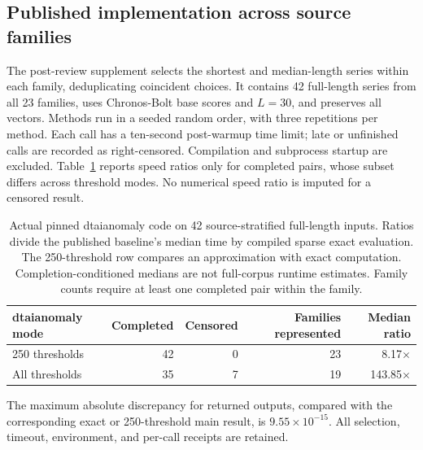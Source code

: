 \subsection{Published implementation across source families}
The post-review supplement selects the shortest and median-length series
within each family, deduplicating coincident choices. It contains
42 full-length series from all 23
families, uses Chronos-Bolt base scores and $L=30$, and preserves all vectors.
Methods run in a seeded random order, with three repetitions per method.
Each call has a ten-second post-warmup time limit; late or unfinished calls
are recorded as right-censored. Compilation and subprocess startup are
excluded. Table~\ref{tab:external} reports speed ratios only for completed
pairs, whose subset differs across threshold modes. No numerical speed ratio
is imputed for a censored result.

\begin{table}[htbp]
\centering
\begin{tabular}{lrrrr}
\toprule
dtaianomaly mode & Completed & Censored & Families represented & Median ratio \\
\midrule
250 thresholds & 42 & 0 & 23 & 8.17$\times$ \\
All thresholds & 35 & 7 & 19 & 143.85$\times$ \\
\bottomrule
\end{tabular}
\caption{Actual pinned dtaianomaly code on 42 source-stratified
full-length inputs. Ratios divide the published baseline's median time by
compiled sparse exact evaluation. The 250-threshold row compares an
approximation with exact computation. Completion-conditioned medians are
not full-corpus runtime estimates. Family counts require at least one completed
pair within the family.}
\label{tab:external}
\end{table}

The maximum absolute discrepancy for returned outputs, compared with the
corresponding exact or 250-threshold main result, is
$9.55\times10^{-15}$. All selection, timeout, environment,
and per-call receipts are retained.
